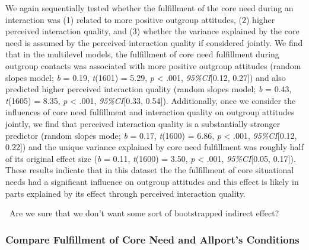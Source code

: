 We again sequentially tested whether the fulfillment of the core need
during an interaction was (1) related to more positive outgroup
attitudes, (2) higher perceived interaction quality, and (3) whether the
variance explained by the core need is assumed by the perceived
interaction quality if considered jointly. We find that in the
multilevel models, the fulfillment of core need fulfillment during
outgroup contacts was associated with more positive outgroup attitudes
(random slopes model; \textit{b} = 0.19, \textit{t}(1601) = 5.29,
\textit{p} \textless{} .001, \textit{95\%CI}{[}0.12, 0.27{]}) and also
predicted higher perceived interaction quality (random slopes model;
\textit{b} = 0.43, \textit{t}(1605) = 8.35, \textit{p} \textless{} .001,
\textit{95\%CI}{[}0.33, 0.54{]}). Additionally, once we consider the
influences of core need fulfillment and interaction quality on outgroup
attitudes jointly, we find that perceived interaction quality is a
substantially stronger predictor (random slopes mode; \textit{b} = 0.17,
\textit{t}(1600) = 6.86, \textit{p} \textless{} .001,
\textit{95\%CI}{[}0.12, 0.22{]}) and the unique variance explained by
core need fulfillment was roughly half of its original effect size
(\textit{b} = 0.11, \textit{t}(1600) = 3.50, \textit{p} \textless{}
.001, \textit{95\%CI}{[}0.05, 0.17{]}). These results indicate that in
this dataset the the fulfillment of core situational needs had a
significant influence on outgroup attitudes and this effect is likely in
parts explained by its effect through perceived interaction quality.

\faQuestionCircle~Are we sure that we don't want some sort of
bootstrapped indirect effect?

\subsubsection{Compare Fulfillment of Core Need and Allport's Conditions}

